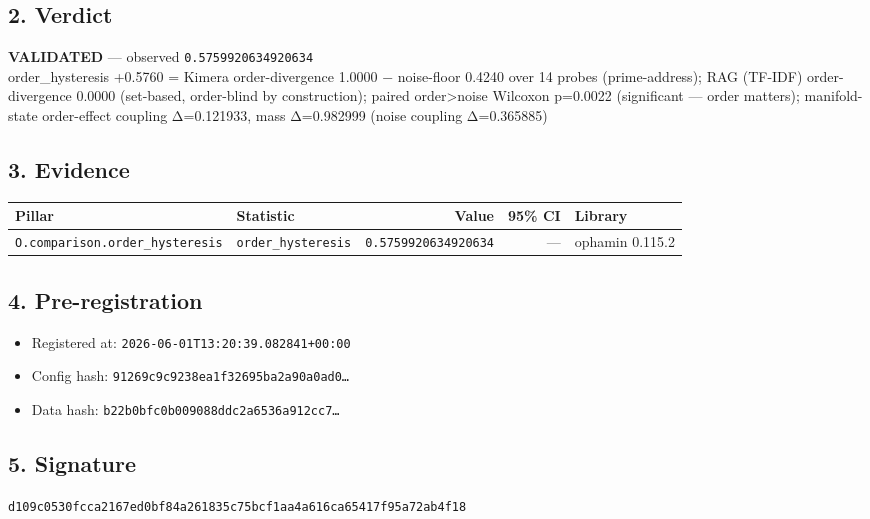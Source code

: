 \documentclass{article}
\begin{document}
\subsection*{2. Verdict}
\textcolor{validated}{\textbf{VALIDATED}} --- observed \texttt{0.5759920634920634}\\
order\_hysteresis +0.5760 = Kimera order-divergence 1.0000 − noise-floor 0.4240 over 14 probes (prime-address); RAG (TF-IDF) order-divergence 0.0000 (set-based, order-blind by construction); paired order>noise Wilcoxon p=0.0022 (significant — order matters); manifold-state order-effect coupling Δ=0.121933, mass Δ=0.982999 (noise coupling Δ=0.365885)
\subsection*{3. Evidence}
\begin{tabular}{llrrl}\toprule
\textbf{Pillar} & \textbf{Statistic} & \textbf{Value} & \textbf{95\% CI} & \textbf{Library} \\\midrule
\texttt{O.comparison.order\_hysteresis} & \texttt{order\_hysteresis} & \texttt{0.5759920634920634} & --- & ophamin 0.115.2 \\
\bottomrule\end{tabular}
\subsection*{4. Pre-registration}
\begin{itemize}
\item Registered at: \texttt{2026-06-01T13:20:39.082841+00:00}
\item Config hash: \texttt{91269c9c9238ea1f32695ba2a90a0ad0\dots}
\item Data hash: \texttt{b22b0bfc0b009088ddc2a6536a912cc7\dots}
\end{itemize}
\subsection*{5. Signature}
\texttt{d109c0530fcca2167ed0bf84a261835c75bcf1aa4a616ca65417f95a72ab4f18}\\
\end{document}
